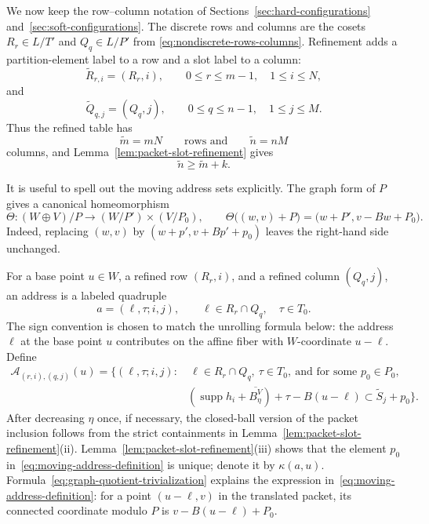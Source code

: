 \documentclass[11pt,reqno]{amsart}
\numberwithin{equation}{section}
\theoremstyle{definition}
\theoremstyle{remark}
\newcommand{\supp}{\operatorname{supp}}
\begin{document}
We now keep the row--column notation of Sections~\ref{sec:hard-configurations} and~\ref{sec:soft-configurations}.  The discrete rows
and columns are the cosets $R_r\in L/T'$ and $Q_q\in L/P'$ from
\eqref{eq:nondiscrete-rows-columns}.  Refinement adds a partition-element label to a row
and a slot label to a column:
\[
 \widetilde R_{r,i}=(R_r,i),
 \qquad
 0\le r\le m-1,
 \quad 1\le i\le N,
\]
and
\[
 \widetilde Q_{q,j}=(Q_q,j),
 \qquad
 0\le q\le n-1,
 \quad 1\le j\le M.
\]
Thus the refined table has
\[
 \widetilde m=mN
 \qquad\text{rows and}\qquad
 \widetilde n=nM
\]
columns, and Lemma~\ref{lem:packet-slot-refinement} gives
\begin{equation}\label{eq:refined-gap}
 \widetilde n\ge\widetilde m+k.
\end{equation}

It is useful to spell out the moving address sets explicitly.  The graph
form of $P$ gives a canonical homeomorphism
\begin{equation}\label{eq:graph-quotient-trivialization}
 \Theta:(W\oplus V)/P\longrightarrow (W/P')\times(V/P_0),
 \qquad
 \Theta\bigl((w,v)+P\bigr)=\bigl(w+P',v-Bw+P_0\bigr).
\end{equation}
Indeed, replacing $(w,v)$ by $(w+p',v+Bp'+p_0)$ leaves the right-hand
side unchanged.

For a base point $u\in W$, a refined row $(R_r,i)$, and a refined column
$(Q_q,j)$, an address is a labeled quadruple
\[
 a=(\ell,\tau;i,j),
 \qquad
 \ell\in R_r\cap Q_q,
 \quad \tau\in T_0.
\]
The sign convention is chosen to match the unrolling formula below: the
address $\ell$ at the base point $u$ contributes on the affine fiber with
$W$-coordinate $u-\ell$.  Define
\begin{equation}\label{eq:moving-address-definition}
\begin{split}
 \mathcal A_{(r,i),(q,j)}(u)
 =\bigl\{(\ell,\tau;i,j):{}&\ \ell\in R_r\cap Q_q,
 \ \tau\in T_0,\ \text{and for some }p_0\in P_0,\\[-1mm]
 & (\supp h_i+\overline{B_\eta^V})+\tau-B(u-\ell)
    \subset \widetilde S_j+p_0\bigr\}.
\end{split}
\end{equation}
After decreasing $\eta$ once, if necessary, the closed-ball version of the
packet inclusion follows from the strict containments in
Lemma~\ref{lem:packet-slot-refinement}(ii).  Lemma~\ref{lem:packet-slot-refinement}(iii)
shows that the element $p_0$ in~\eqref{eq:moving-address-definition} is
unique; denote it by $\kappa(a,u)$.  Formula~\eqref{eq:graph-quotient-trivialization}
explains the expression in~\eqref{eq:moving-address-definition}: for a point
$(u-\ell,v)$ in the translated packet, its connected coordinate modulo $P$
is $v-B(u-\ell)+P_0$.
\end{document}
